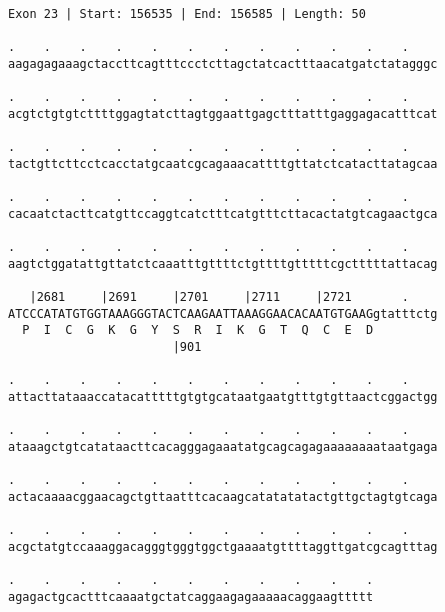 \documentclass{article}
\begin{document}
\begin{Verbatim}[fontfamily=courier]
Exon 23 | Start: 156535 | End: 156585 | Length: 50

.    .    .    .    .    .    .    .    .    .    .    .    
aagagagaaagctaccttcagtttccctcttagctatcactttaacatgatctatagggc

.    .    .    .    .    .    .    .    .    .    .    .    
acgtctgtgtcttttggagtatcttagtggaattgagctttatttgaggagacatttcat

.    .    .    .    .    .    .    .    .    .    .    .    
tactgttcttcctcacctatgcaatcgcagaaacattttgttatctcatacttatagcaa

.    .    .    .    .    .    .    .    .    .    .    .    
cacaatctacttcatgttccaggtcatctttcatgtttcttacactatgtcagaactgca

.    .    .    .    .    .    .    .    .    .    .    .    
aagtctggatattgttatctcaaatttgttttctgttttgtttttcgctttttattacag

   |2681     |2691     |2701     |2711     |2721       .    
ATCCCATATGTGGTAAAGGGTACTCAAGAATTAAAGGAACACAATGTGAAGgtatttctg
  P  I  C  G  K  G  Y  S  R  I  K  G  T  Q  C  E  D         
                       |901                                 

.    .    .    .    .    .    .    .    .    .    .    .    
attacttataaaccatacatttttgtgtgcataatgaatgtttgtgttaactcggactgg

.    .    .    .    .    .    .    .    .    .    .    .    
ataaagctgtcatataacttcacagggagaaatatgcagcagagaaaaaaaataatgaga

.    .    .    .    .    .    .    .    .    .    .    .    
actacaaaacggaacagctgttaatttcacaagcatatatatactgttgctagtgtcaga

.    .    .    .    .    .    .    .    .    .    .    .    
acgctatgtccaaaggacagggtgggtggctgaaaatgttttaggttgatcgcagtttag

.    .    .    .    .    .    .    .    .    .    .
agagactgcactttcaaaatgctatcaggaagagaaaaacaggaagttttt
\end{Verbatim}
\newpage
\end{document}
